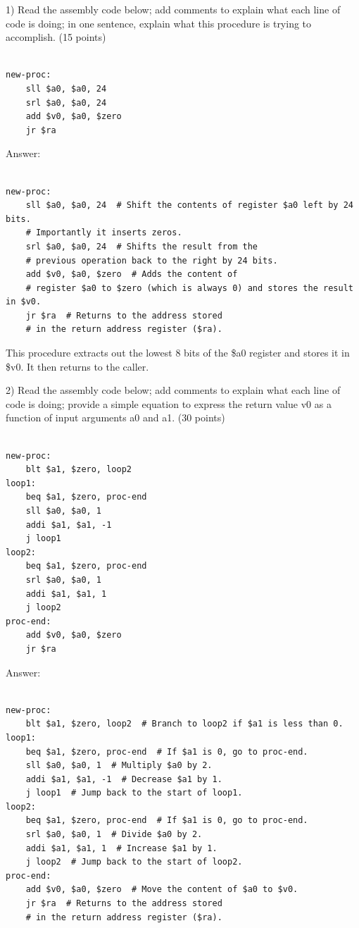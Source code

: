 \documentclass{article}
\begin{document}
1) Read the assembly code below; add comments to explain what each line of code is doing;
in one sentence, explain what this procedure is trying to accomplish. (15 points) 

\begin{lstlisting}[language={[x86masm]Assembler}]

new-proc:
    sll $a0, $a0, 24
    srl $a0, $a0, 24
    add $v0, $a0, $zero
    jr $ra

\end{lstlisting}


Answer:

\begin{lstlisting}[language={[x86masm]Assembler}]

new-proc:
    sll $a0, $a0, 24  # Shift the contents of register $a0 left by 24 bits.
    # Importantly it inserts zeros.
    srl $a0, $a0, 24  # Shifts the result from the
    # previous operation back to the right by 24 bits.
    add $v0, $a0, $zero  # Adds the content of
    # register $a0 to $zero (which is always 0) and stores the result in $v0.
    jr $ra  # Returns to the address stored
    # in the return address register ($ra).

\end{lstlisting}

This procedure extracts out the lowest 8 bits of the \$a0 register and stores
it in \$v0. It then returns to the caller.


\newpage

2) Read the assembly code below; add comments to explain what each line of code
is doing; provide a simple equation to express the return value v0
as a function of input arguments a0 and a1. (30 points) 

\begin{lstlisting}[language={[x86masm]Assembler}]

new-proc:
    blt $a1, $zero, loop2
loop1:
    beq $a1, $zero, proc-end
    sll $a0, $a0, 1
    addi $a1, $a1, -1
    j loop1
loop2:
    beq $a1, $zero, proc-end
    srl $a0, $a0, 1
    addi $a1, $a1, 1
    j loop2
proc-end:
    add $v0, $a0, $zero
    jr $ra

\end{lstlisting}


Answer:

\begin{lstlisting}[language={[x86masm]Assembler}]

new-proc:
    blt $a1, $zero, loop2  # Branch to loop2 if $a1 is less than 0.
loop1:
    beq $a1, $zero, proc-end  # If $a1 is 0, go to proc-end.
    sll $a0, $a0, 1  # Multiply $a0 by 2.
    addi $a1, $a1, -1  # Decrease $a1 by 1.
    j loop1  # Jump back to the start of loop1.
loop2:
    beq $a1, $zero, proc-end  # If $a1 is 0, go to proc-end.
    srl $a0, $a0, 1  # Divide $a0 by 2.
    addi $a1, $a1, 1  # Increase $a1 by 1.
    j loop2  # Jump back to the start of loop2.
proc-end:
    add $v0, $a0, $zero  # Move the content of $a0 to $v0.
    jr $ra  # Returns to the address stored
    # in the return address register ($ra).

\end{lstlisting}
\end{document}
